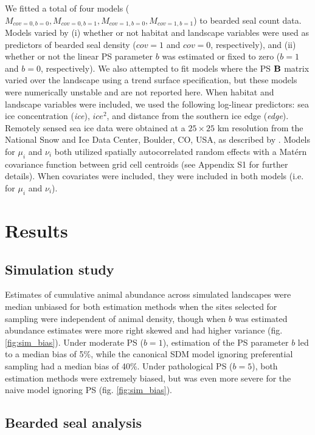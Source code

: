 \documentclass[times,mee,doublespace,]{besauth2}
\begin{document}
We fitted a total of four models ($M_{cov=0,b=0},M_{cov=0,b=1},M_{cov=1,b=0},M_{cov=1,b=1}$) to bearded seal count data.  Models varied by (i) whether or not habitat and landscape variables were used as predictors of bearded seal density ($cov=1$ and $cov=0$, respectively), and (ii) whether or not the linear PS parameter $b$ was estimated or fixed to zero ($b=1$ and $b=0$, respectively).  We also attempted to fit models where the PS ${\bf B}$ matrix varied over the landscape using a trend surface specification, but these models were numerically unstable and are not reported here.  When habitat and landscape variables were included, we used the following log-linear predictors: sea ice concentration (\textit{ice}), $ice^2$, and distance from the southern ice edge (\textit{edge}).  Remotely sensed sea ice data were obtained at a $25 \times 25$ km resolution from the National Snow and Ice Data Center, Boulder, CO, USA, as described by \citet{ConnEtAl2014}.  Models for $\mu_i$ and $\nu_i$ both utilized spatially autocorrelated random effects with a Mat\'{e}rn covariance function between grid cell centroids (see Appendix S1 for further details).  When covariates were included, they were included in both models (i.e. for $\mu_i$ and $\nu_i$).


\section{Results}

\subsection{Simulation study}

Estimates of cumulative animal abundance across simulated landscapes were median unbiased for both estimation methods when the sites selected for sampling were independent of animal density, though when $b$ was estimated abundance estimates were more right skewed and had higher variance (fig. \ref{fig:sim_bias}).  Under moderate PS ($b=1$), estimation of the PS parameter $b$ led to a median bias of 5\%, while the canonical SDM model ignoring preferential sampling had a median bias of 40\%.  Under pathological PS ($b=5$), both estimation methods were extremely biased, but was even more severe for the naive model ignoring PS (fig. \ref{fig:sim_bias}).

\subsection{Bearded seal analysis}
\end{document}
